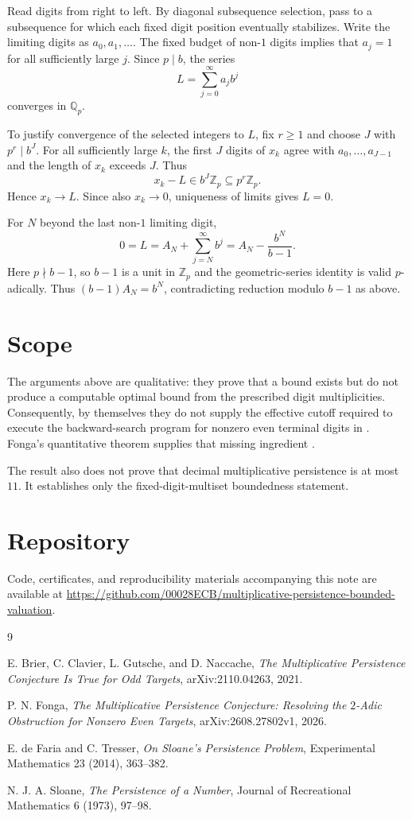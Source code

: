 \documentclass[11pt]{article}
\begin{document}
Read digits from right to left. By diagonal subsequence selection, pass to a
subsequence for which each fixed digit position eventually stabilizes. Write
the limiting digits as $a_0,a_1,\dots$. The fixed budget of non-$1$ digits
implies that $a_j=1$ for all sufficiently large $j$. Since $p\mid b$, the series
\[
L=\sum_{j=0}^{\infty}a_jb^j
\]
converges in $\mathbb Q_p$.

To justify convergence of the selected integers to $L$, fix $r\ge1$ and choose
$J$ with $p^r\mid b^J$. For all sufficiently large $k$, the first $J$ digits
of $x_k$ agree with $a_0,\dots,a_{J-1}$ and the length of $x_k$ exceeds $J$.
Thus
\[
x_k-L\in b^J\mathbb Z_p\subseteq p^r\mathbb Z_p.
\]
Hence $x_k\to L$. Since also $x_k\to0$, uniqueness of limits gives $L=0$.

For $N$ beyond the last non-$1$ limiting digit,
\[
0=L
 =A_N+\sum_{j=N}^{\infty}b^j
 =A_N-\frac{b^N}{b-1}.
\]
Here $p\nmid b-1$, so $b-1$ is a unit in $\mathbb Z_p$ and the geometric-series
identity is valid $p$-adically. Thus $(b-1)A_N=b^N$, contradicting reduction
modulo $b-1$ as above.

\section{Scope}

The arguments above are qualitative: they prove that a bound exists but do not
produce a computable optimal bound from the prescribed digit multiplicities.
Consequently, by themselves they do not supply the effective cutoff required
to execute the backward-search program for nonzero even terminal digits in
\cite{BCGN}. Fonga's quantitative theorem supplies that missing ingredient
\cite{Fonga}.

The result also does not prove that decimal multiplicative persistence is at
most $11$. It establishes only the fixed-digit-multiset boundedness statement.

\section*{Repository}

Code, certificates, and reproducibility materials accompanying this note are available at
\url{https://github.com/00028ECB/multiplicative-persistence-bounded-valuation}.

\begin{thebibliography}{9}

E. Brier, C. Clavier, L. Gutsche, and D. Naccache,
\emph{The Multiplicative Persistence Conjecture Is True for Odd Targets},
arXiv:2110.04263, 2021.

P. N. Fonga,
\emph{The Multiplicative Persistence Conjecture: Resolving the $2$-Adic
Obstruction for Nonzero Even Targets},
arXiv:2608.27802v1, 2026.

E. de Faria and C. Tresser,
\emph{On Sloane's Persistence Problem},
Experimental Mathematics 23 (2014), 363--382.

N. J. A. Sloane,
\emph{The Persistence of a Number},
Journal of Recreational Mathematics 6 (1973), 97--98.

\end{thebibliography}
\end{document}
